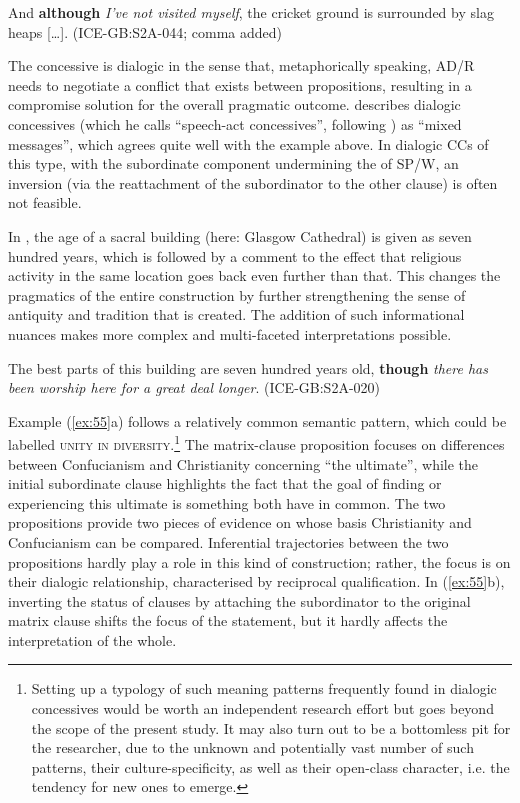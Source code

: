 \ea\label{ex:53}   \label{bkm:Ref487559655}And \textbf{although} \textit{I’ve not visited myself}, the cricket ground is surrounded by slag heaps […]. (ICE-GB:S2A-044; comma added)\\
\z

The concessive is dialogic in the sense that, metaphorically speaking, AD/R needs to negotiate a conflict that exists between propositions, resulting in a compromise solution for the overall pragmatic outcome. \citet[166]{Hilpert2013a} describes dialogic concessives (which he calls “speech-act concessives”, following \citealt{Sweetser1990}) as “mixed messages”, which agrees quite well with the example above. In dialogic CCs of this type, with the subordinate component undermining the  of SP/W, an inversion (via the reattachment of the subordinator to the other clause) is often not feasible.

In , the age of a sacral building (here: Glasgow Cathedral) is given as seven hundred years, which is followed by a comment to the effect that religious activity in the same location goes back even further than that. This changes the pragmatics of the entire construction by further strengthening the sense of antiquity and tradition that is created. The addition of such informational nuances makes more complex and multi-faceted interpretations possible.

\ea\label{ex:54}   \label{bkm:Ref487280197}The best parts of this building are seven hundred years old, \textbf{though} \textit{there has been worship here for a great deal longer}. (ICE-GB:S2A-020)\\
\z

Example (\ref{ex:55}a) follows a relatively common semantic pattern, which could be labelled \textsc{unity in diversity}.\footnote{\label{fn38}Setting up a typology of such meaning patterns frequently found in dialogic concessives would be worth an independent research effort but goes beyond the scope of the present study. It may also turn out to be a bottomless pit for the researcher, due to the unknown and potentially vast number of such patterns, their culture-specificity, as well as their open-class character, i.e. the tendency for new ones to emerge.} The matrix-clause proposition focuses on differences between Confucianism and Christianity concerning “the ultimate”, while the initial subordinate clause highlights the fact that the goal of finding or experiencing this ultimate is something both have in common. The two propositions provide two pieces of evidence on whose basis Christianity and Confucianism can be compared. Inferential trajectories between the two propositions hardly play a role in this kind of construction; rather, the focus is on their dialogic relationship, characterised by reciprocal qualification. In (\ref{ex:55}b), inverting the status of clauses by attaching the subordinator to the original matrix clause shifts the focus of the statement, but it hardly affects the interpretation of the whole.

